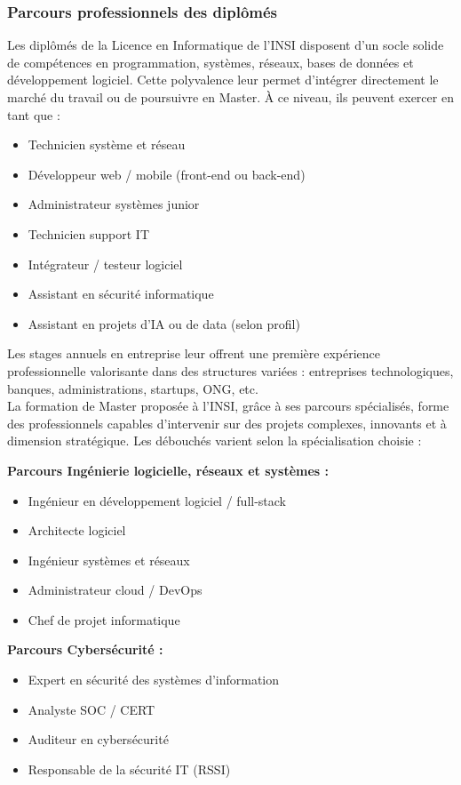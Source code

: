 \documentclass[a4paper,12pt, oneside]{article}
\begin{document}
\subsubsection{Parcours professionnels des diplômés} 
Les diplômés de la Licence en Informatique de l’INSI disposent d’un socle solide de compétences en programmation, systèmes, réseaux, bases de données et développement logiciel. Cette polyvalence leur permet d’intégrer directement le marché du travail ou de poursuivre en Master. À ce niveau, ils peuvent exercer en tant que :
\begin{itemize}
    \item Technicien système et réseau
    \item Développeur web / mobile (front-end ou back-end)
    \item Administrateur systèmes junior
    \item Technicien support IT
    \item Intégrateur / testeur logiciel
    \item Assistant en sécurité informatique
    \item Assistant en projets d’IA ou de data (selon profil)
\end{itemize}

Les stages annuels en entreprise leur offrent une première expérience professionnelle valorisante dans des structures variées : entreprises technologiques, banques, administrations, startups, ONG, etc.\\

La formation de Master proposée à l’INSI, grâce à ses parcours spécialisés, forme des professionnels capables d’intervenir sur des projets complexes, innovants et à dimension stratégique. Les débouchés varient selon la spécialisation choisie :

\textbf{Parcours Ingénierie logicielle, réseaux et systèmes :}
\begin{itemize}
    \item Ingénieur en développement logiciel / full-stack
    \item Architecte logiciel
    \item Ingénieur systèmes et réseaux
    \item Administrateur cloud / DevOps
    \item Chef de projet informatique
\end{itemize}

\textbf{Parcours Cybersécurité :}
\begin{itemize}
    \item Expert en sécurité des systèmes d'information
    \item Analyste SOC / CERT
    \item Auditeur en cybersécurité
    \item Responsable de la sécurité IT (RSSI)
\end{itemize}
\end{document}
